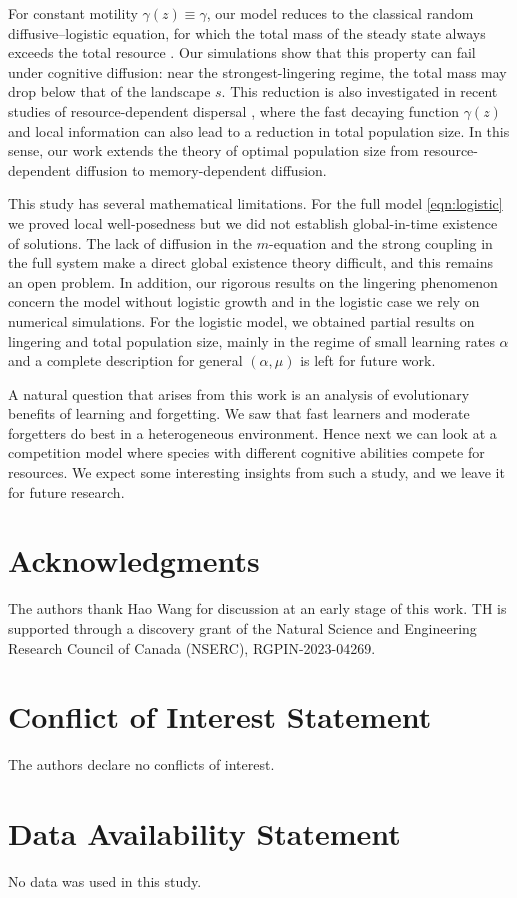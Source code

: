 \documentclass{article}
\begin{document}
For constant motility $\gamma(z)\equiv \gamma$, our model reduces to the classical random diffusive--logistic equation, for which the total mass of the steady state always exceeds the total resource \cite{Lou2006}. Our simulations show that this property can fail under cognitive diffusion: near the strongest-lingering regime, the total mass may drop below that of the landscape $s$. This reduction is also investigated in recent studies of resource-dependent dispersal \cite{Tang2023}, where the fast decaying function $\gamma(z)$ and local information can also lead to a reduction in total population size. In this sense, our work extends the theory of optimal population size from resource-dependent diffusion to memory-dependent diffusion. 

This study has several mathematical limitations. 
For the full model \eqref{eqn:logistic} we proved local well-posedness but we did not establish global-in-time existence of solutions. 
The lack of diffusion in the $m$-equation and the strong coupling in the full system make a direct global existence theory difficult, and this remains an open problem. 
In addition, our rigorous results on the lingering phenomenon concern the model without logistic growth and in the logistic case we rely on numerical simulations. 
For the logistic model, we obtained partial results on lingering and total population size, mainly in the regime of small learning rates $\alpha$ and a complete description for general $(\alpha,\mu)$ is left for future work.

A natural question that arises from this work is an analysis of evolutionary benefits of learning and forgetting. We saw that fast learners and moderate forgetters do best in a heterogeneous environment. Hence next we can look at a competition model where species with different cognitive abilities compete for resources. We expect some interesting insights from such a study, and we leave it for future research. 



\color{black}


\section*{Acknowledgments}
The authors thank Hao Wang for discussion at an early stage of this work. TH is supported through a discovery grant of the Natural Science and Engineering Research Council of Canada (NSERC), RGPIN-2023-04269.


\section*{Conflict of Interest Statement}
The authors declare no conflicts of interest.

\section*{Data Availability Statement}
No data was used in this study.


  
\end{document}
